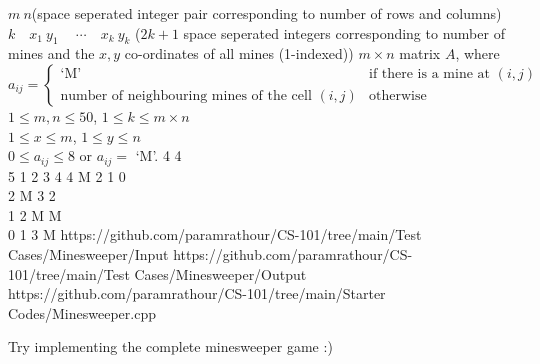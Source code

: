 \begin{testcasesMore}
	{%
	$m\ n$\hfill(space seperated integer pair corresponding to number of rows and columns)\\$k\quad x_1\ y_1\ \quad\cdots\quad x_{k}\ y_{k}$ \hfill($2k+1$ space seperated integers corresponding to number of mines and the $x,y$ co-ordinates of all mines (1-indexed))}
	{$m\times n$ matrix $A$, where $a_{ij}=\begin{cases}
		\text{`M'}& \text{if there is a mine at $(i,j)$} \\
		\text{number of neighbouring mines of the cell $(i,j)$} & \text{otherwise}
	\end{cases}$}
	{$1 \leq m,n \leq 50$, $1 \leq k \leq m\times n$\\$1 \leq x \leq m$, $1 \leq y \leq n$\\$0 \leq a_{ij} \leq 8$ or $a_{ij}=$ `M'.}%
	{4 4\\5 1  2  3 4 4}
	{M 2 1 0\\	2 M 3 2 \\	1 2 M M \\	0 1 3 M}
	{https://github.com/paramrathour/CS-101/tree/main/Test Cases/Minesweeper/Input}
	{https://github.com/paramrathour/CS-101/tree/main/Test Cases/Minesweeper/Output}
	{https://github.com/paramrathour/CS-101/tree/main/Starter Codes/Minesweeper.cpp}
\end{testcasesMore}
\begin{note}
	Try implementing the complete minesweeper game :)
\end{note}